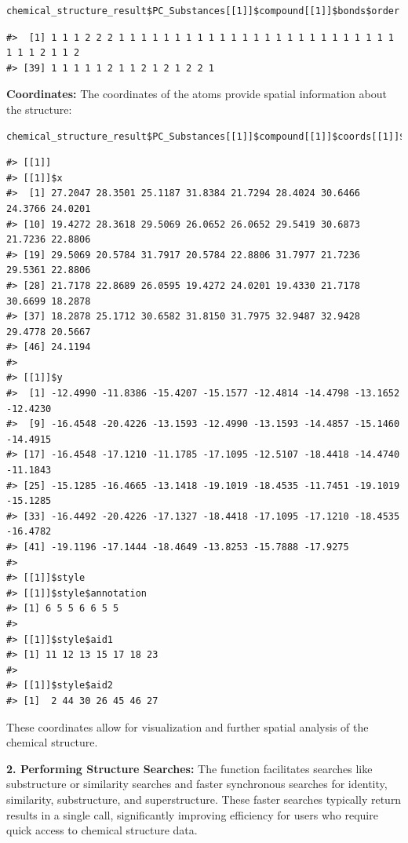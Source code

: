 \begin{verbatim}
chemical_structure_result$PC_Substances[[1]]$compound[[1]]$bonds$order
\end{verbatim}

\begin{verbatim}
#>  [1] 1 1 1 2 2 2 1 1 1 1 1 1 1 1 1 1 1 1 1 1 1 1 1 1 1 1 1 1 1 1 1 1 1 1 2 1 1 2
#> [39] 1 1 1 1 1 2 1 1 2 1 2 1 2 2 1
\end{verbatim}

\textbf{Coordinates:}
The coordinates of the atoms provide spatial information about the structure:

\begin{verbatim}
chemical_structure_result$PC_Substances[[1]]$compound[[1]]$coords[[1]]$conformers
\end{verbatim}

\begin{verbatim}
#> [[1]]
#> [[1]]$x
#>  [1] 27.2047 28.3501 25.1187 31.8384 21.7294 28.4024 30.6466 24.3766 24.0201
#> [10] 19.4272 28.3618 29.5069 26.0652 26.0652 29.5419 30.6873 21.7236 22.8806
#> [19] 29.5069 20.5784 31.7917 20.5784 22.8806 31.7977 21.7236 29.5361 22.8806
#> [28] 21.7178 22.8689 26.0595 19.4272 24.0201 19.4330 21.7178 30.6699 18.2878
#> [37] 18.2878 25.1712 30.6582 31.8150 31.7975 32.9487 32.9428 29.4778 20.5667
#> [46] 24.1194
#> 
#> [[1]]$y
#>  [1] -12.4990 -11.8386 -15.4207 -15.1577 -12.4814 -14.4798 -13.1652 -12.4230
#>  [9] -16.4548 -20.4226 -13.1593 -12.4990 -13.1593 -14.4857 -15.1460 -14.4915
#> [17] -16.4548 -17.1210 -11.1785 -17.1095 -12.5107 -18.4418 -14.4740 -11.1843
#> [25] -15.1285 -16.4665 -13.1418 -19.1019 -18.4535 -11.7451 -19.1019 -15.1285
#> [33] -16.4492 -20.4226 -17.1327 -18.4418 -17.1095 -17.1210 -18.4535 -16.4782
#> [41] -19.1196 -17.1444 -18.4649 -13.8253 -15.7888 -17.9275
#> 
#> [[1]]$style
#> [[1]]$style$annotation
#> [1] 6 5 5 6 6 5 5
#> 
#> [[1]]$style$aid1
#> [1] 11 12 13 15 17 18 23
#> 
#> [[1]]$style$aid2
#> [1]  2 44 30 26 45 46 27
\end{verbatim}

These coordinates allow for visualization and further spatial analysis of the chemical structure.

\textbf{2. Performing Structure Searches:} The function facilitates searches like substructure or similarity searches and faster synchronous searches for identity, similarity, substructure, and superstructure. These faster searches typically return results in a single call, significantly improving efficiency for users who require quick access to chemical structure data.

